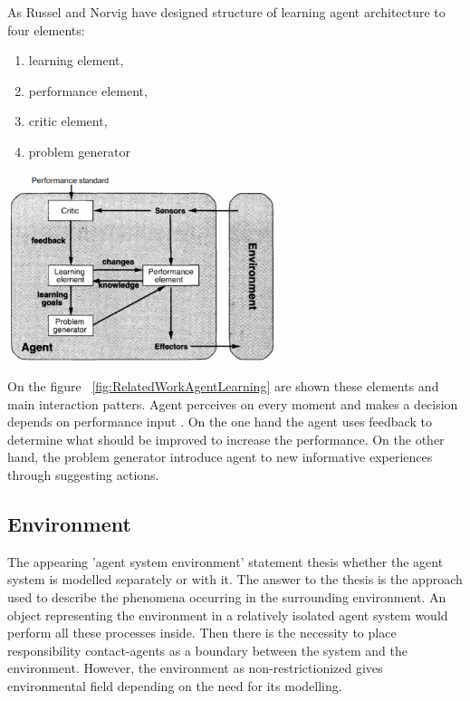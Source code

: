 As Russel and Norvig \cite{SLStructure} have designed structure of learning agent architecture to four elements:
\begin{enumerate}
	\item learning element,
	\item performance element,
	\item critic element,
	\item problem generator
\end{enumerate}

\begin{center}
	\includegraphics[width=8cm, keepaspectratio]{diagrams/related_work/SLAgents}
	\center
	\label{fig:RelatedWorkAgentLearning}
\end{center}

On the figure ~\ref{fig:RelatedWorkAgentLearning} are shown these elements and main interaction patters. Agent perceives on every moment and makes a decision depends on performance input \cite{SLKhaled}. On the one hand the agent uses feedback to determine what should be improved to increase the performance. On the other hand, the problem generator introduce agent to new informative experiences through suggesting actions.

\subsection{Environment}

The appearing 'agent system environment' statement thesis whether the agent system is modelled separately or with it. The answer to the thesis is the approach used to describe the phenomena occurring in the surrounding environment. An object representing the environment in a relatively isolated agent system would perform all these processes inside.
Then there is the necessity to place responsibility contact-agents as a boundary between the system and the environment. However, the environment as non-restrictionized gives environmental field depending on the need for its modelling.


